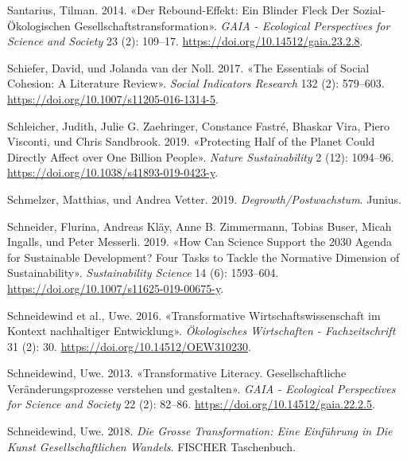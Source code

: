 \documentclass[
  nswissgerman,
  a4paper,
  openany]{book}
\newlength{\cslhangindent}
\newenvironment{CSLReferences}[2] %
 {\begin{list}{}{%
  \setlength{\itemindent}{0pt}
  \setlength{\leftmargin}{0pt}
  \setlength{\parsep}{0pt}
  \ifodd #1
   \setlength{\leftmargin}{\cslhangindent}
   \setlength{\itemindent}{-1\cslhangindent}
  \fi
  \setlength{\itemsep}{#2\baselineskip}}}
 {\end{list}}
\begin{document}
\begin{CSLReferences}{1}{1}
Santarius, Tilman. 2014. {«Der {Rebound-Effekt}: Ein Blinder {Fleck} Der
Sozial-{Ö}kologischen {Gesellschaftstransformation}»}. \emph{GAIA -
Ecological Perspectives for Science and Society} 23 (2): 109--17.
\url{https://doi.org/10.14512/gaia.23.2.8}.

{Schiefer, David, und Jolanda van der Noll}. 2017. {«The {Essentials} of
{Social Cohesion}: {A Literature Review}»}. \emph{Social Indicators
Research} 132 (2): 579--603.
\url{https://doi.org/10.1007/s11205-016-1314-5}.

Schleicher, Judith, Julie G. Zaehringer, Constance Fastré, Bhaskar Vira,
Piero Visconti, und Chris Sandbrook. 2019. {«Protecting Half of the
Planet Could Directly Affect over One Billion People»}. \emph{Nature
Sustainability} 2 (12): 1094--96.
\url{https://doi.org/10.1038/s41893-019-0423-y}.

Schmelzer, Matthias, und Andrea Vetter. 2019.
\emph{Degrowth/{Postwachstum}}. Junius.

Schneider, Flurina, Andreas Kläy, Anne B. Zimmermann, Tobias Buser,
Micah Ingalls, und Peter Messerli. 2019. {«How Can Science Support the
2030 {Agenda} for {Sustainable Development}? {Four} Tasks to Tackle the
Normative Dimension of Sustainability»}. \emph{Sustainability Science}
14 (6): 1593--604. \url{https://doi.org/10.1007/s11625-019-00675-y}.

Schneidewind et al., Uwe. 2016. {«{Transformative
Wirtschaftswissenschaft im Kontext nachhaltiger Entwicklung}»}.
\emph{{Ö}kologisches Wirtschaften - Fachzeitschrift} 31 (2): 30.
\url{https://doi.org/10.14512/OEW310230}.

Schneidewind, Uwe. 2013. {«{Transformative Literacy. Gesellschaftliche
Ver{ä}nderungsprozesse verstehen und gestalten}»}. \emph{GAIA -
Ecological Perspectives for Science and Society} 22 (2): 82--86.
\url{https://doi.org/10.14512/gaia.22.2.5}.

Schneidewind, Uwe. 2018. \emph{Die {Grosse Transformation}: {Eine
Einf{ü}hrung} in Die {Kunst} Gesellschaftlichen {Wandels}}. FISCHER
Taschenbuch.


\end{CSLReferences}
\end{document}
